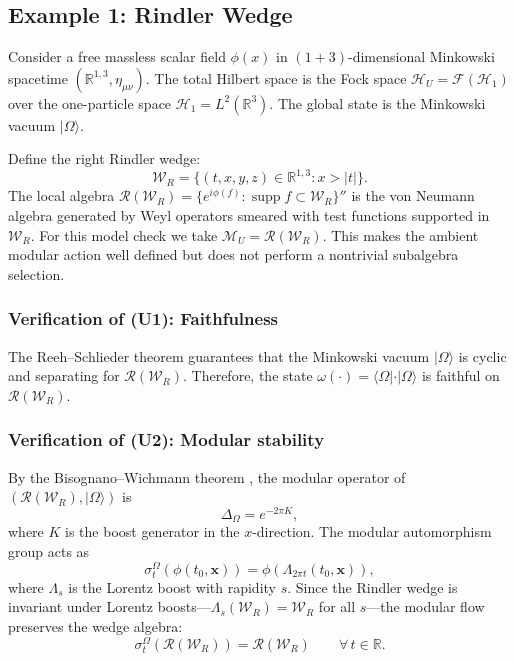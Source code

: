 \documentclass[12pt,a4paper,openany]{book}
\begin{document}
\subsection{Example 1: Rindler Wedge}
\label{D-sec:rindler}

Consider a free massless scalar field $\phi(x)$ in $(1+3)$-dimensional Minkowski spacetime $(\mathbb{R}^{1,3}, \eta_{\mu\nu})$.
The total Hilbert space is the Fock space $\mathcal{H}_U = \mathcal{F}(\mathcal{H}_1)$ over the one-particle space $\mathcal{H}_1 = L^2(\mathbb{R}^3)$.
The global state is the Minkowski vacuum $|\Omega\rangle$.

Define the right Rindler wedge:
\begin{equation}
\mathcal{W}_R = \{(t, x, y, z) \in \mathbb{R}^{1,3} : x > |t|\}.
\end{equation}
The local algebra $\mathcal{R}(\mathcal{W}_R) = \{e^{i\phi(f)} : \operatorname{supp} f \subset \mathcal{W}_R\}''$ is the von Neumann algebra generated by Weyl operators smeared with test functions supported in $\mathcal{W}_R$.
For this model check we take $\mathcal M_U=\mathcal R(\mathcal W_R)$.  This makes the ambient modular action well defined but does not perform a nontrivial subalgebra selection.

\subsubsection{Verification of (U1): Faithfulness}

The Reeh--Schlieder theorem \cite{Haag1996} guarantees that the Minkowski vacuum $|\Omega\rangle$ is cyclic and separating for $\mathcal{R}(\mathcal{W}_R)$.
Therefore, the state $\omega(\cdot) = \langle\Omega|\cdot|\Omega\rangle$ is faithful on $\mathcal{R}(\mathcal{W}_R)$.

\subsubsection{Verification of (U2): Modular stability}

By the Bisognano--Wichmann theorem \cite{BisognanoWichmann1975, BisognanoWichmann1976}, the modular operator of $(\mathcal{R}(\mathcal{W}_R), |\Omega\rangle)$ is
\begin{equation}
\Delta_\Omega = e^{-2\pi K},
\end{equation}
where $K$ is the boost generator in the $x$-direction.
The modular automorphism group acts as
\begin{equation}
\sigma_t^\Omega(\phi(t_0, \mathbf{x})) = \phi(\Lambda_{2\pi t}(t_0, \mathbf{x})),
\end{equation}
where $\Lambda_s$ is the Lorentz boost with rapidity $s$.
Since the Rindler wedge is invariant under Lorentz boosts---$\Lambda_s(\mathcal{W}_R) = \mathcal{W}_R$ for all $s$---the modular flow preserves the wedge algebra:
\begin{equation}
\sigma_t^\Omega(\mathcal{R}(\mathcal{W}_R)) = \mathcal{R}(\mathcal{W}_R) \qquad \forall\, t \in \mathbb{R}.
\end{equation}
\end{document}
